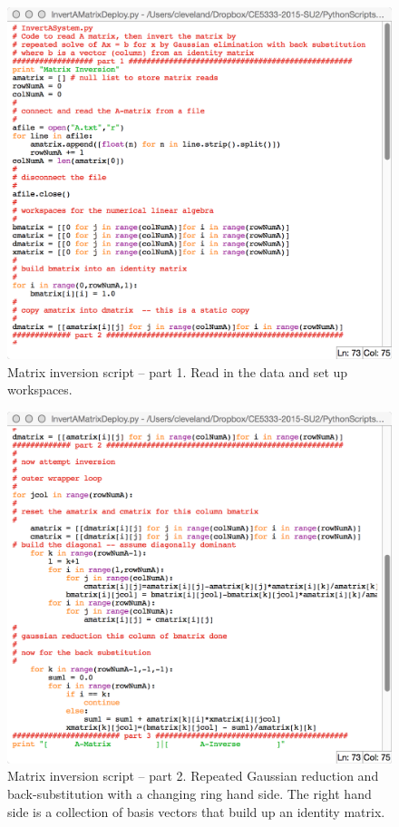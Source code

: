 \begin{figure}[h!] %
   \centering
   \includegraphics[width=6in]{./9-Matrix/InversionOne.jpg} 
   \caption{Matrix inversion script -- part 1.  Read in the data and set up workspaces.}
   \label{fig:InversionOne}
\end{figure}


\begin{figure}[h!] %
   \centering
   \includegraphics[width=6in]{./9-Matrix/InversionTwo.jpg} 
   \caption{Matrix inversion script -- part 2.  Repeated Gaussian reduction and back-substitution with a changing ring hand side.  The right hand side is a collection of basis vectors that build up an identity matrix.}
   \label{fig:InversionTwo}
\end{figure}

